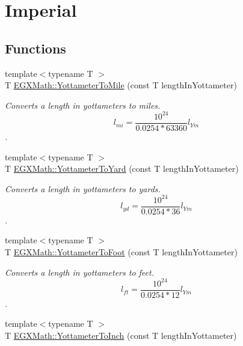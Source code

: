 \hypertarget{group___e_g_x_math-_conversions-_length_conversions-_s_i-_yottameter-_imperial}{}\section{Imperial}
\label{group___e_g_x_math-_conversions-_length_conversions-_s_i-_yottameter-_imperial}
\subsection*{Functions}
\begin{DoxyCompactItemize}
\item 
{\footnotesize template$<$typename T $>$ }\\T \mbox{\hyperlink{group___e_g_x_math-_conversions-_length_conversions-_s_i-_yottameter-_imperial_ga4ca41b9b222f31926417df30e0539b50}{E\+G\+X\+Math\+::\+Yottameter\+To\+Mile}} (const T length\+In\+Yottameter)
\begin{DoxyCompactList}\small\item\em Converts a length in yottameters to miles. \[ l_{mi}=\frac{10^{24}}{0.0254 * 63360} l_{Ym} \]. \end{DoxyCompactList}\item 
{\footnotesize template$<$typename T $>$ }\\T \mbox{\hyperlink{group___e_g_x_math-_conversions-_length_conversions-_s_i-_yottameter-_imperial_ga87f19dee341e81a7bb72bf4a5134935f}{E\+G\+X\+Math\+::\+Yottameter\+To\+Yard}} (const T length\+In\+Yottameter)
\begin{DoxyCompactList}\small\item\em Converts a length in yottameters to yards. \[ l_{yd}= \frac{10^{24}}{0.0254 * 36} l_{Ym} \]. \end{DoxyCompactList}\item 
{\footnotesize template$<$typename T $>$ }\\T \mbox{\hyperlink{group___e_g_x_math-_conversions-_length_conversions-_s_i-_yottameter-_imperial_gae693078fe8f9b2ca717732916dcf28d7}{E\+G\+X\+Math\+::\+Yottameter\+To\+Foot}} (const T length\+In\+Yottameter)
\begin{DoxyCompactList}\small\item\em Converts a length in yottameters to feet. \[ l_{ft}= \frac{10^{24}}{0.0254 * 12} l_{Ym} \]. \end{DoxyCompactList}\item 
{\footnotesize template$<$typename T $>$ }\\T \mbox{\hyperlink{group___e_g_x_math-_conversions-_length_conversions-_s_i-_yottameter-_imperial_ga6de8b1bd4812d6814328cb5d54adf08c}{E\+G\+X\+Math\+::\+Yottameter\+To\+Inch}} (const T length\+In\+Yottameter)

\end{DoxyCompactItemize}
